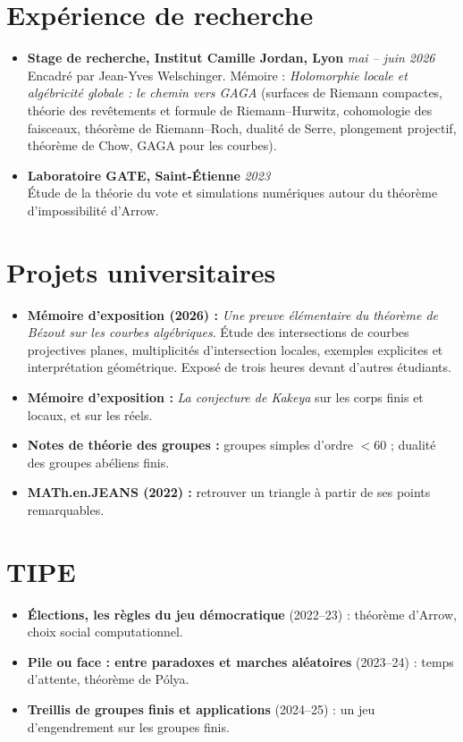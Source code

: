 \documentclass[11pt,a4paper]{article}
\begin{document}
	\section*{Expérience de recherche}
	\begin{itemize}[leftmargin=1em, label={}]
		\item \textbf{Stage de recherche, Institut Camille Jordan, Lyon} \hfill \textit{mai -- juin 2026} \\
		Encadré par Jean-Yves Welschinger. Mémoire : \textit{Holomorphie locale et algébricité globale : le chemin vers GAGA} (surfaces de Riemann compactes, théorie des revêtements et formule de Riemann--Hurwitz, cohomologie des faisceaux, théorème de Riemann--Roch, dualité de Serre, plongement projectif, théorème de Chow, GAGA pour les courbes).
		\vspace{0.02cm}

		\item \textbf{Laboratoire GATE, Saint-Étienne} \hfill \textit{2023} \\
		Étude de la théorie du vote et simulations numériques autour du théorème d'impossibilité d'Arrow.
	\end{itemize}

	\section*{Projets universitaires}
	\begin{itemize}[leftmargin=1.5em, label=\textbullet, itemsep=2pt]
		\item \textbf{Mémoire d'exposition (2026) :} \textit{Une preuve élémentaire du théorème de Bézout sur les courbes algébriques}. Étude des intersections de courbes projectives planes, multiplicités d'intersection locales, exemples explicites et interprétation géométrique. Exposé de trois heures devant d'autres étudiants.
		\item \textbf{Mémoire d'exposition :} \textit{La conjecture de Kakeya} sur les corps finis et locaux, et sur les réels.
		\item \textbf{Notes de théorie des groupes :} groupes simples d'ordre $< 60$ ; dualité des groupes abéliens finis.
		\item \textbf{MATh.en.JEANS (2022) :} retrouver un triangle à partir de ses points remarquables.
	\end{itemize}

	\section*{TIPE}
	\begin{itemize}[leftmargin=1.5em, label=\textbullet, itemsep=2pt]
		\item \textbf{Élections, les règles du jeu démocratique} (2022--23) : théorème d'Arrow, choix social computationnel.
		\item \textbf{Pile ou face : entre paradoxes et marches aléatoires} (2023--24) : temps d'attente, théorème de Pólya.
		\item \textbf{Treillis de groupes finis et applications} (2024--25) : un jeu d'engendrement sur les groupes finis.
	\end{itemize}
\end{document}
